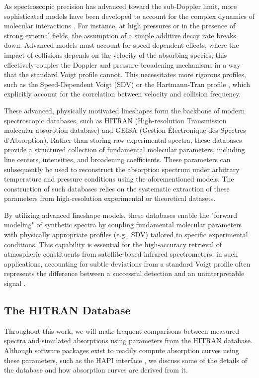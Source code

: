 \documentclass[8pt,a4paper]{report}
\begin{document}
	As spectroscopic precision has advanced toward the sub-Doppler limit, more sophisticated models have been developed to account for the complex dynamics of molecular interactions \cite{book_collisionalEffects_hartmann}. For instance, at high pressures or in the presence of strong external fields, the assumption of a simple additive decay rate breaks down. Advanced models must account for speed-dependent effects, where the impact of collisions depends on the velocity of the absorbing species; this effectively couples the Doppler and pressure broadening mechanisms in a way that the standard Voigt profile cannot. This necessitates more rigorous profiles, such as the Speed-Dependent Voigt (SDV) or the Hartmann-Tran profile \cite{hartmann_tran_IUPAC}, which explicitly account for the correlation between velocity and collision frequency.
	
	These advanced, physically motivated lineshapes form the backbone of modern spectroscopic databases, such as HITRAN (High-resolution Transmission molecular absorption database) and GEISA (Gestion Électronique des Spectres d'Absorption). Rather than storing raw experimental spectra, these databases provide a structured collection of fundamental molecular parameters, including line centers, intensities, and broadening coefficients. These parameters can subsequently be used to reconstruct the absorption spectrum under arbitrary temperature and pressure conditions using the aforementioned models. The construction of such databases relies on the systematic extraction of these parameters from high-resolution experimental or theoretical datasets.
	
	By utilizing advanced lineshape models, these databases enable the "forward modeling" of synthetic spectra by coupling fundamental molecular parameters with physically appropriate profiles (e.g., SDV) tailored to specific experimental conditions. This capability is essential for the high-accuracy retrieval of atmospheric constituents from satellite-based infrared spectrometers; in such applications, accounting for subtle deviations from a standard Voigt profile often represents the difference between a successful detection and an uninterpretable signal \cite{hitran_cia_2019}.
	
	\subsection{The HITRAN Database}
	
	Throughout this work, we will make frequent comparisons between measured spectra and simulated absorptions using parameters from the HITRAN database. Although software packages exist to readily compute absorption curves using these parameters, such as the HAPI interface \cite{HAPI_2016}, we discuss some of the details of the database and how absorption curves are derived from it.
	
\end{document}
